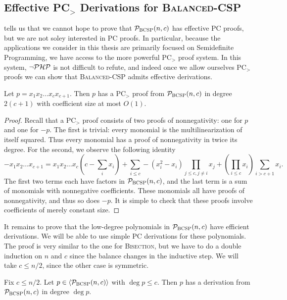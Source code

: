 \subsection{Effective PC$_>$ Derivations for \textsc{Balanced-CSP}}
 tells us that we cannot hope to prove that $\mathcal P_{\textsc{BCSP}}(n,c)$ has effective PC proofs, but we are not soley interested in PC proofs. In particular, because the applications we consider in this thesis are primarily focused on Semidefinite Programming, we have access to the more powerful PC$_>$ proof system. In this system, $\neg\mathcal P\mathcal H\mathcal P$ is not difficult to refute, and indeed once we allow ourselves PC$_>$ proofs we can show that \textsc{Balanced-CSP} admits effective derivations.
\begin{lemma}\label{lem:highdeg-easy}
Let $p = x_1x_2\dots x_c x_{c+1}$. Then $p$ has a PC$_>$ proof from $\mathcal P_{\textsc{BCSP}}(n,c)$ in degree $2(c+1)$ with coefficient size at most $O(1)$. 
\end{lemma}
\begin{proof}
Recall that a PC$_>$ proof consists of two proofs of nonnegativity: one for $p$ and one for $-p$. The first is trivial: every monomial is the multilinearization of itself squared. Thus every monomial has a proof of nonnegativity in twice its degree. For the second, we observe the following identity
\[-x_1x_2\dots x_{c+1} = x_1x_2\dots x_c\left(c - \sum_i x_i\right) + \sum_{i \leq c} -(x_i^2 - x_i) \prod_{j \leq c, j\neq i} x_j + \left(\prod_{i \leq c} x_i\right) \sum_{i > c+1} x_i. \]
The first two terms each have factors in $\mathcal P_{\textsc{BCSP}}(n,c)$, and the last term is a sum of monomials with nonnegative coefficients. These monomials all have proofs of nonnegativity, and thus so does $-p$. It is simple to check that these proofs involve coefficients of merely constant size. 
\end{proof}
It remains to prove that the low-degree polynomials in $\mathcal P_{\textsc{BCSP}}(n,c)$ have efficient derivations. We will be able to use simple PC derivations for these polynomials. The proof is very similar to the one for \textsc{Bisection}, but we have to do a double induction on $n$ and $c$ since the balance changes in the inductive step. We will take $c \leq n/2$, since the other case is symmetric.
\begin{lemma}\label{lem:lowdeg-easy}
Fix $c \leq n/2$. Let $p \in \langle \mathcal P_{\textsc{BCSP}}(n,c) \rangle$ with $\deg p \leq c$. Then $p$ has a derivation from $\mathcal P_{\textsc{BCSP}}(n,c)$ in degree $\deg p$. 
\end{lemma}
